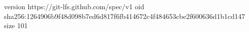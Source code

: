 version https://git-lfs.github.com/spec/v1
oid sha256:1264906b9f48d098b7ed6d817f6fb414672c4f484653cbe2f600636d1b1cd147
size 101
